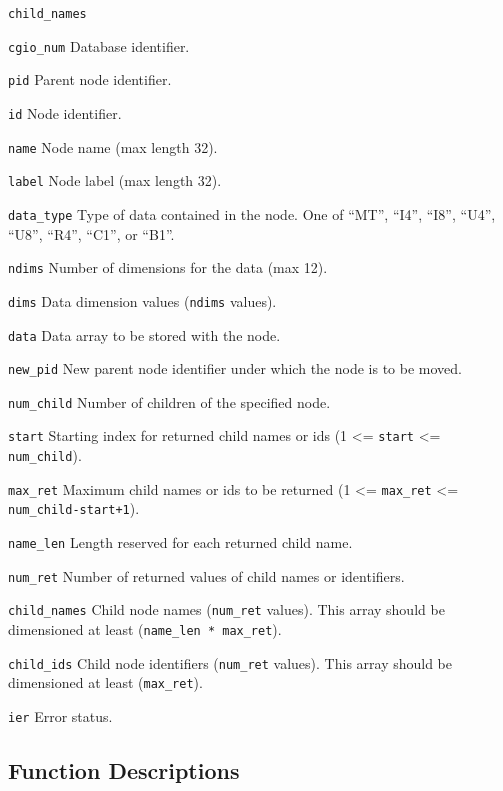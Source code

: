 \begin{Ventryi}{\texttt{child\_names}}\raggedright
\item [\texttt{cgio\_num}]
      Database identifier.
\item [\texttt{pid}]
      Parent node identifier.
\item [\texttt{id}]
      Node identifier.
\item [\texttt{name}]
      Node name (max length 32).
\item [\texttt{label}]
      Node label (max length 32).
\item [\texttt{data\_type}]
      Type of data contained in the node. One of ``MT'', ``I4'', ``I8'',
      ``U4'', ``U8'', ``R4'', ``C1'', or ``B1''.
\item [\texttt{ndims}]
      Number of dimensions for the data (max 12).
\item [\texttt{dims}]
      Data dimension values (\texttt{ndims} values).
\item [\texttt{data}]
      Data array to be stored with the node.
\item [\texttt{new\_pid}]
      New parent node identifier under which the node is to be moved.
\item [\texttt{num\_child}]
      Number of children of the specified node.
\item [\texttt{start}]
      Starting index for returned child names or ids
      (1 <= \texttt{start} <= \texttt{num\_child}).
\item [\texttt{max\_ret}]
      Maximum child names or ids to be returned
      (1 <= \texttt{max\_ret} <= \texttt{num\_child-start+1}).
\item [\texttt{name\_len}]
      Length reserved for each returned child name.
\item [\texttt{num\_ret}]
      Number of returned values of child names or identifiers.
\item [\texttt{child\_names}]
      Child node names (\texttt{num\_ret} values). This array should
      be dimensioned at least (\texttt{name\_len * max\_ret}).
\item [\texttt{child\_ids}]
      Child node identifiers (\texttt{num\_ret} values). This array
       should be dimensioned at least (\texttt{max\_ret}).
\item [\texttt{ier}]
      Error status.
\end{Ventryi}

\subsection{Function Descriptions}

